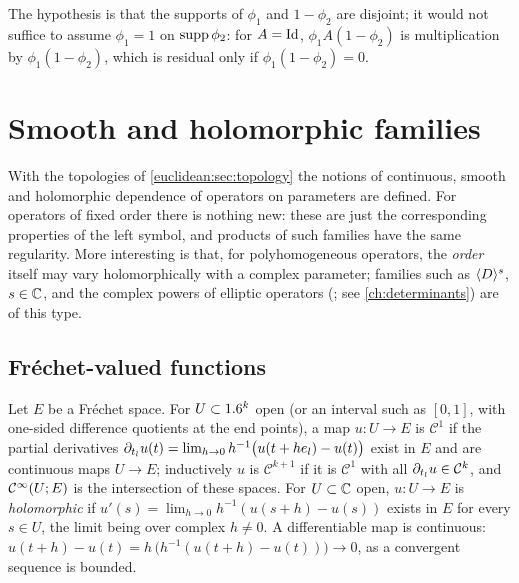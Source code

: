 The hypothesis is that the supports of $\phi_1$ and $1-\phi_2$ are disjoint;
it would not suffice to assume $\phi_1=1$ on $\operatorname{supp}\phi_2$: for $A=\operatorname{Id}$,
$\phi_1A(1-\phi_2)$ is multiplication by $\phi_1(1-\phi_2)$, which is
residual only if $\phi_1(1-\phi_2)=0$.

\section{Smooth and holomorphic families}\label{euclidean:sec:families}

With the topologies of \cref{euclidean:sec:topology} the notions of
continuous, smooth and holomorphic dependence of operators on parameters are
defined. For operators of fixed order there is nothing new: these are just
the corresponding properties of the left symbol, and products of such
families have the same regularity. More interesting is that, for
polyhomogeneous operators, the \emph{order} itself may vary holomorphically
with a complex parameter; families such as $\langle D\rangle^s$, $s\in\mathbb{C}$, and the
complex powers of elliptic operators (\cite{Seeley}; see
\cref{ch:determinants}) are of this type.

\subsection{Fr\'echet-valued functions}

Let $E$ be a Fr\'echet space. For $U\subset1.6^k$ open (or an interval such as
$[0,1]$, with one-sided difference quotients at the end points), a map
$u:U\to E$ is $\mathcal C^1$ if the partial derivatives
$\partial_{t_l}u(t)=\lim_{h\to0}h^{-1}\bigl(u(t+he_l)-u(t)\bigr)$ exist in $E$ and
are continuous maps $U\to E$; inductively $u$ is $\mathcal C^{k+1}$ if it is
$\mathcal C^1$ with all $\partial_{t_l}u\in\mathcal C^k$, and $\mathcal{C}^\infty(U;E)$ is the
intersection of these spaces. For $U\subset\mathbb{C}$ open, $u:U\to E$ is
\emph{holomorphic} if $u'(s)=\lim_{h\to0}h^{-1}(u(s+h)-u(s))$ exists in $E$
for every $s\in U$, the limit being over complex $h\ne0$. A differentiable
map is continuous: $u(t+h)-u(t)=h\,\bigl(h^{-1}(u(t+h)-u(t))\bigr)\to0$, as a
convergent sequence is bounded.

